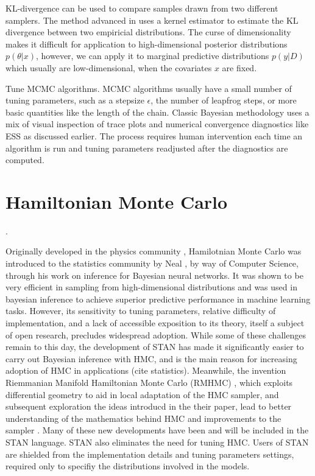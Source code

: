 \documentclass{book}
\begin{document}
\begin{enumerate}
KL-divergence can be used to compare samples drawn from two different samplers.
The method advanced in \cite{boltz2007knn,boltz2007high} uses a kernel estimator to estimate the KL divergence between two empiricial distributions. The curse of dimensionality makes it difficult for application to high-dimensional posterior distributions $p(\theta|x)$, however, we can apply it to marginal predictive distributions $p(y|D)$ which usually are low-dimensional, when the covariates $x$ are fixed.

Tune MCMC algorithms. MCMC algorithms usually have a small number of tuning
parameters, such as a stepsize $\epsilon$, the number of leapfrog steps, or more
basic quantities like the length of the chain. Classic Bayesian methodology
\cite{robert2013monte} uses a mix of visual inspection of trace plots and
numerical convergence diagnostics like ESS as discussed earlier. The process
requires human intervention each time an algorithm is run and tuning parameters
readjusted after the diagnostics are computed. 


\section{ Hamiltonian Monte Carlo }. 

Originally developed in the physics community \cite{duane1987hybrid},
Hamilotnian Monte Carlo was introduced to the statistics community by Neal
\cite{neal2012bayesian}, 
by way of Computer Science, through his work on inference for Bayesian neural
networks. It was shown to be very efficient in sampling from high-dimensional
distributions and was used in bayesian inference to achieve superior predictive
performance in machine learning tasks\cite{guyon2004result}. However, its sensitivity to tuning parameters, relative difficulty of
implementation, and a lack of accessible
exposition to its theory, itself a subject of open research, precludes
widespread adoption. While some of these challenges remain to this day, the development of STAN \cite{carpenter2016stan} has made it significantly easier to carry out Bayesian inference with HMC, and is the main reason for increasing adoption of HMC in applications (cite statistics). Meanwhile, the invention Riemmanian Manifold Hamiltonian Monte Carlo (RMHMC) \cite{girolami2011riemann}, which exploits differential geometry to aid in local adaptation of the HMC sampler, and subsequent exploration the ideas introducd in the their paper, lead to better understanding of the mathematics behind HMC \cite{livingstone2016geometric,betancourt2014geometric} and  improvements to the sampler \cite{betancourt2013generalizing,betancourt2013general}. Many of these new developments have been and will be included in the STAN language. STAN also eliminates the need for tuning HMC. Users of STAN are shielded from the implementation details and tuning parameters settings, required only to specifiy the distributions involved in the models. 


\end{enumerate}
\end{document}
